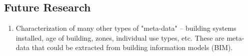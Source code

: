 \subsection{Future Research}
\label{sec:futureresearch}

\begin{enumerate}
\item Characterization of many other types of "meta-data" -- building systems installed, age of building, zones, individual use types, etc. These are meta-data that could be extracted from building information models (BIM). 
\end{enumerate}
